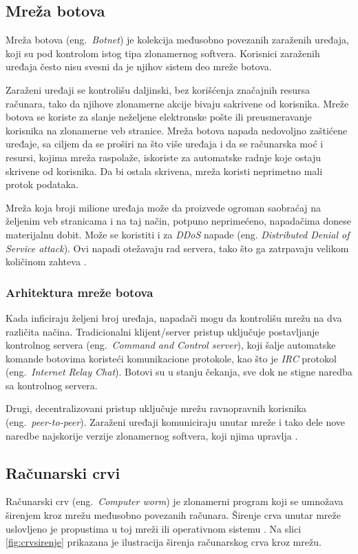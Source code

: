 \documentclass[a4paper]{article}
\begin{document}
\subsection{Mreža botova}
\label{botnet}

Mreža botova (eng.~{\em Botnet}) je kolekcija 
međusobno povezanih zaraženih uređaja, koji su pod kontrolom istog tipa zlonamernog softvera. Korisnici zaraženih uređaja često nisu svesni da je njihov sistem deo mreže botova.

Zaraženi uređaji se kontrolišu daljinski, bez 
korišćenja značajnih resursa računara, tako da njihove zlonamerne akcije bivaju sakrivene od korisnika. Mreže botova se koriste za slanje neželjene elektronske 
pošte ili preusmeravanje korisnika na zlonamerne veb 
stranice. Mreža botova napada nedovoljno zaštićene 
uređaje, sa ciljem da se proširi na što više uređaja i da se računarska moć i resursi, kojima mreža 
raspolaže, iskoriste za automatske radnje koje ostaju 
skrivene od korisnika. Da bi ostala skrivena, mreža 
koristi neprimetno mali protok podataka. 

Mreža koja broji milione uređaja može da proizvede ogroman saobraćaj na željenim veb stranicama i na taj način, potpuno neprimećeno, napadačima donese materijalnu dobit. Može se koristiti i za \textit{DDoS} napade (eng. \textit{Distributed Denial of Service attack}). Ovi napadi otežavaju rad servera, tako što ga zatrpavaju velikom količinom zahteva \cite{botnet}.

\subsubsection{Arhitektura mreže botova}

Kada inficiraju željeni broj uređaja, napadači mogu da kontrolišu mrežu na dva različita načina. Tradicionalni klijent/server pristup uključuje postavljanje kontrolnog servera (eng.~{\em Command and Control server}), koji šalje automatske komande botovima koristeći komunikacione protokole, kao što je \textit{IRC} protokol (eng.~{\em Internet Relay Chat}). Botovi su u stanju čekanja, sve dok ne stigne naredba sa kontrolnog servera.

Drugi, decentralizovani pristup uključuje mrežu ravnopravnih korisnika (eng.~{\em peer-to-peer}). Zaraženi uređaji komuniciraju unutar mreže i tako dele nove naredbe najskorije verzije zlonamernog softvera, koji njima upravlja \cite{botnet}.

\subsection{Računarski crvi}
Računarski crv (eng.~{\em Computer worm}) je zlonamerni program koji se umnožava širenjem kroz mrežu međusobno povezanih računara. Širenje crva unutar mreže uslovljeno je propustima u toj mreži ili operativnom sistemu \cite{norton_worm, ethics}. Na slici \ref{fig:crvsirenje} prikazana je ilustracija širenja računarskog crva kroz mrežu.
\end{document}
